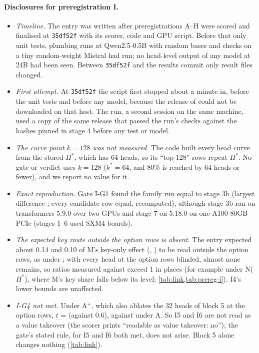 \paragraph{Disclosures for preregistration I.}
\begin{itemize}\setlength\itemsep{1pt}
  \item \emph{Timeline.} The entry was written after preregistrations A--H were scored and finalised at \texttt{35df52f} with its scorer, code and GPU script. Before that only unit tests, plumbing runs at Qwen2.5-0.5B with random bases and checks on a tiny random-weight Mistral had run; no head-level output of any model at 24B had been seen. Between \texttt{35df52f} and the results commit only result files changed.
  \item \emph{First attempt.} At \texttt{35df52f} the script first stopped about a minute in, before the unit tests and before any model, because the release of \citet{anonymous2026fitted} could not be downloaded on that host. The run, a second session on the same machine, used a copy of the same release that passed the run's checks against the hashes pinned in stage 4 before any test or model.
  \item \emph{The curve point $k = 128$ was not measured.} The code built every head curve from the stored $H^*$, which has 64 heads, so its ``top 128'' rows repeat $H^*$. No gate or verdict uses $k = 128$ ($k^* = 64$, and 80\% is reached by 64 heads or fewer), and we report no value for it.
  \item \emph{Exact reproduction.} Gate I-G1 found the family run equal to stage 3b (largest difference \IgoneaMaxDiff{}; every candidate row equal, recomputed), although stage 3b ran on transformers 5.9.0 over two GPUs and stage 7 on 5.18.0 on one A100 80GB PCIe (stages 1--6 used SXM4 boards).
  \item \emph{The expected key route outside the option rows is absent.} The entry expected about 0.14 and 0.10 of M's key-only effect (\fmtOpt{}, \fmtLetter{}) to be read outside the option rows, as under \fmtNone{}; with every head at the option rows blinded, almost none remains, so ratios measured against \fmtNone{} exceed 1 in places (for example under N($H^*$), where M's key share falls below its \fmtNone{} level; \cref{tab:link,tab:prereg-i}). I4's lower bounds are unaffected.
  \item \emph{I-G4 not met.} Under A$^+$, which also ablates the 32 heads of block 5 at the option rows, $t$ = \IgfourT{} (against 0.6), against \IsixT{} under A. So I5 and I6 are not read as a value takeover (the scorer prints ``readable as value takeover: no''); the gate's stated rule, for I5 and I6 both met, does not arise. Block 5 alone changes nothing (\cref{tab:link}).

\end{itemize}
